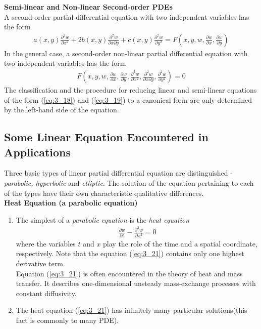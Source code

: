 \documentclass[11pt]{report}
\newcommand{\NI}{\noindent}
\newcommand{\sps}{\\[0.2cm]}
\newcommand{\refn}[1]{(\ref{#1})}
\newcommand{\refx}[1]{\refn{eq:#1}}
\newcommand{\bt}[1]{\textbf{#1}}
\begin{document}
	\NI\bt{Semi-linear and Non-linear Second-order PDEs}\sps
	A second-order partial differential equation with two independent variables has the form
	\begin{eqnarray}
		a(x,y)\frac{\partial^2 w}{\partial x^2} + 2b(x,y)\frac{\partial^2 w}{\partial x \partial y} + c(x,y)\frac{\partial^2 w}{\partial y^2} = F\left(x,y,w,\frac{\partial w}{\partial x},\frac{\partial w}{\partial y}\right)\label{eq:3_19}
	\end{eqnarray}
	In the general case, a second-order non-linear partial differential equation with two independent variables has the form
	\begin{eqnarray}
		F\left(x,y,w,\frac{\partial w}{\partial x},\frac{\partial w}{\partial y},\frac{\partial^2 w}{\partial x^2},\frac{\partial^2 w}{\partial x\partial y}, \frac{\partial^2 w}{\partial y^2}\right) = 0\label{eq:3_20}
	\end{eqnarray}
	The classification and the procedure for reducing linear and semi-linear equations of the form \refx{3_18} and \refx{3_19} to a canonical form are only determined by the left-hand side of the equation.
	
	\subsection{Some Linear Equation Encountered in Applications}
	Three basic types of linear partial differential equation are distinguished - \textit{parabolic, hyperbolic} and \textit{elliptic}. The solution of the equation pertaining to each of the types have their own characteristic qualitative differences.\sps
	
	\NI\bt{Heat Equation (a parabolic equation)}
	\begin{enumerate}
		\item The simplest of a \textit{parabolic equation} is the \textit{heat equation}
		\begin{eqnarray}
			\frac{\partial w}{\partial t} - \frac{\partial^2 w}{\partial x^2} = 0 \label{eq:3_21}
		\end{eqnarray}
		where the variables $t$ and $x$ play the role of the time and a spatial coordinate, respectively. Note that the equation \refx{3_21} contains only one highest derivative term.\\
		Equation \refx{3_21} is often encountered in the theory of heat and mass transfer. It describes one-dimensional unsteady mass-exchange processes with constant diffusivity.
		
		\item The heat equation \refx{3_21} has infinitely many particular solutions(this fact is commonly to many PDE).
	\end{enumerate}
	
\end{document}
